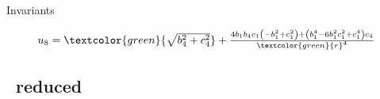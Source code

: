 \documentclass{beamer}
\begin{document}
\begin{frame}{Invariants}
\begin{block}{}
{\[\begin{array}{ll}
	u_8=\textcolor{green}{\sqrt{b_4^2+c_4^2}}+\frac{4 b_1
 	b_4 c_1 \left(-b_1^2+c_1^2\right)+\left(b_1^4-6 b_1^2 c_1^2+c_1^4\right) c_4}{\textcolor{green}{r}^4}
	\end{array}
	\]
}
  \end{block}


\end{frame}

\subsection{\KS\ reduced}
\end{document}
